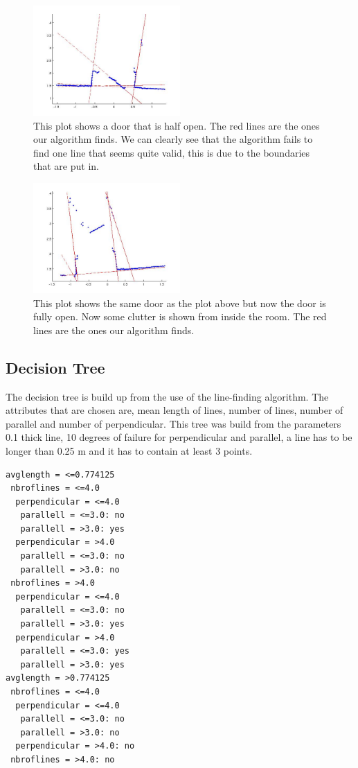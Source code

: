 \documentclass[a4paper, 10pt, conference]{ieeeconf}      %
\begin{document}
\begin{figure}
\centering
\includegraphics[width=0.5\textwidth]{presimg/doorhalflines.jpg}
\caption{This plot shows a door that is half open. The red lines are the ones our algorithm finds. We can clearly see that the algorithm fails to find one line that seems quite valid, this is due to the boundaries that are put in.}
\label{doorhalf}
\end{figure}

\begin{figure}
\centering
\includegraphics[width=0.5\textwidth]{presimg/doorfullines.jpg}
\caption{This plot shows the same door as the plot above but now the door is fully open. Now some clutter is shown from inside the room. The red lines are the ones our algorithm finds.}
\label{doorfull}
\end{figure}

\subsection{Decision Tree}
The decision tree is build up from the use of the line-finding algorithm. The attributes that are chosen are, mean length of lines, number of lines, number of parallel and number of perpendicular. This tree was build from the parameters 0.1 thick line, 10 degrees of failure for perpendicular and parallel, a line has to be longer than 0.25 m and it has to contain at least 3 points.

\begin{lstlisting}
avglength = <=0.774125
 nbroflines = <=4.0
  perpendicular = <=4.0
   parallell = <=3.0: no
   parallell = >3.0: yes
  perpendicular = >4.0
   parallell = <=3.0: no
   parallell = >3.0: no
 nbroflines = >4.0
  perpendicular = <=4.0
   parallell = <=3.0: no
   parallell = >3.0: yes
  perpendicular = >4.0
   parallell = <=3.0: yes
   parallell = >3.0: yes
avglength = >0.774125
 nbroflines = <=4.0
  perpendicular = <=4.0
   parallell = <=3.0: no
   parallell = >3.0: no
  perpendicular = >4.0: no
 nbroflines = >4.0: no

\end{lstlisting}
\end{document}
